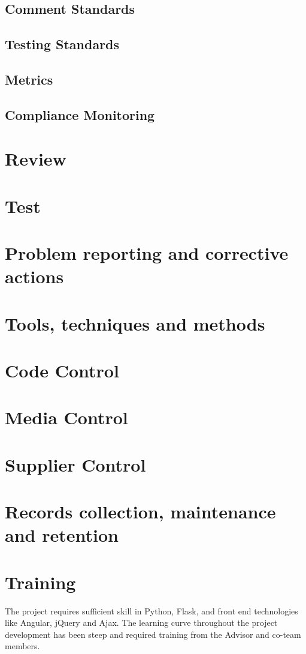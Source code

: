 \documentclass[12pt,letterpaper, margin=1in]{article}
\begin{document}
\subsection{Comment Standards}

\subsection{Testing Standards}

\subsection{Metrics}

\subsection{Compliance Monitoring}

\section{Review}

\section{Test}

\section{Problem reporting and corrective actions}
\section{Tools, techniques and methods}
\section{Code Control}
\section{Media Control}
\section{Supplier Control}
\section{Records collection, maintenance and retention}

\section{Training}
The project requires sufficient skill in Python, Flask, and front end technologies like Angular, jQuery and Ajax. The learning curve throughout the project development has been steep and required training from the Advisor and co-team members. 
\end{document}
